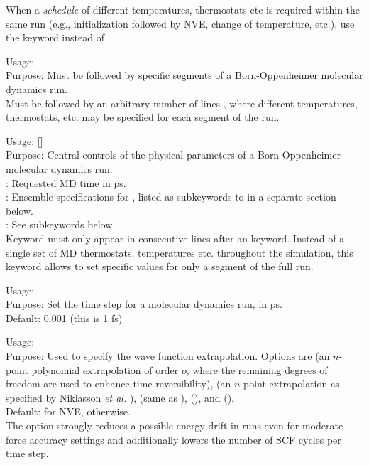 When a \emph{schedule} of different temperatures, thermostats etc is required
within the same run (e.g., initialization followed by NVE, change of
temperature, etc.), use the  keyword instead of
. 

{\noindent
   Usage:  \\[1.0ex] 
   Purpose: Must be followed by specific segments of a 
     Born-Oppenheimer molecular dynamics run. \\
} 
Must be followed by an arbitrary number of lines , where
different temperatures, thermostats, etc. may be specified for each segment of
the run. 

{\noindent
   Usage:   
     [] \\[1.0ex] 
   Purpose: Central controls of the physical parameters of a
     Born-Oppenheimer molecular dynamics run. \\[1.0ex]
    : Requested MD time in ps. \\
    : Ensemble specifications for ,
     listed as subkeywords to  in a separate section
     below. \\
   : See  subkeywords
     below. \\
} 
Keyword  must only appear in consecutive lines after an
 keyword. Instead of a single set of MD thermostats,
temperatures etc. throughout the simulation, this keyword allows to set
specific values for only a segment of the full run.

{\noindent
	Usage:   \\[1.0em]
	Purpose: Set the time step for a molecular dynamics run, in ps. \\[1.0em]
	Default: 0.001 (this is 1 fs)
	}

{\noindent
  Usage:   \\[1.0em]
  Purpose: Used to specify the wave function extrapolation.  Options are
   (an $n$-point polynomial extrapolation of
  order $o$, where the remaining degrees of freedom are used to enhance time
  reversibility),  (an $n$-point extrapolation as
  specified by Niklasson \emph{et al.} \cite{nik06}),  (same as
  ),  (), and  ().\\[1.0em]
  Default:  for NVE,  otherwise.\\
}
The option  strongly reduces a possible energy drift
in  runs even for moderate force accuracy settings and
additionally lowers the number of SCF cycles per time step.

